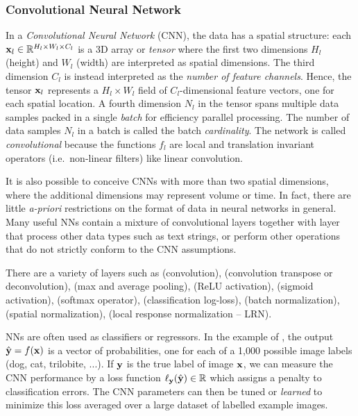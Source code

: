 \subsubsection{Convolutional Neural Network}

In a \emph{Convolutional Neural Network} (CNN), the data has a spatial structure: each $\mathbf{x}_l\in\mathbb{R}^{H_l \times W_l \times C_l}$ is a 3D array or \emph{tensor} where the first two dimensions $H_l$ (height) and $W_l$ (width) are interpreted as spatial dimensions. The third dimension $C_l$ is instead interpreted as the \emph{number of feature channels}. Hence, the tensor $\mathbf{x}_l$ represents a $H_l \times W_l$ field of $C_l$-dimensional feature vectors, one for each spatial location. A fourth dimension $N_l$ in the tensor spans multiple data samples packed in a single \emph{batch} for efficiency parallel processing. The number of data samples $N_l$ in a batch is called the batch \emph{cardinality}. The network is called \emph{convolutional} because the functions $f_l$ are local and translation invariant operators (i.e.\ non-linear filters) like linear convolution.

It is also possible to conceive CNNs with more than two spatial dimensions, where the additional dimensions may represent volume or time. In fact, there are little \emph{a-priori} restrictions on the format of data in neural networks in general. Many useful NNs contain a mixture of convolutional layers together with layer that process other data types such as text strings, or perform other operations that do not strictly conform  to the CNN assumptions.

There are a variety of layers such as (convolution),  (convolution transpose or deconvolution),  (max and average pooling),  (ReLU activation),  (sigmoid activation),  (softmax operator),  (classification log-loss), (batch normalization), (spatial normalization), (local response normalization -- LRN). 

NNs are often used as classifiers or regressors. In the example of , the output $\hat {\mathbf{y}} = f(\mathbf{x})$ is a vector of probabilities, one for each of a 1,000 possible image labels (dog, cat, trilobite, ...).  If $\mathbf{y}$ is the true label of image $\mathbf{x}$, we can measure the CNN performance by a loss function $\ell_{\mathbf{y}}(\hat {\mathbf{y}})  \in \mathbb{R}$ which assigns a penalty to classification errors. The CNN parameters can then be tuned or \emph{learned} to minimize this loss averaged over a large dataset of labelled example images.

